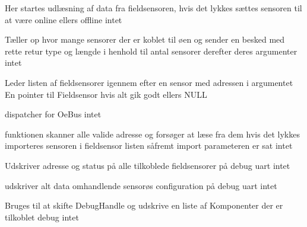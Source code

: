 {Her startes udlæsning af data fra fieldsensoren, hvis det lykkes sættes sensoren til at være online ellers offline}
{intet}
{
}

{Tæller op hvor mange sensorer der er koblet til øen og sender en besked med rette retur type og længde i henhold til antal sensorer derefter deres argumenter}
{intet}
{
}

{Leder listen af fieldsensorer igennem efter en sensor med adressen i argumentet}
{En pointer til Fieldsensor hvis alt gik godt ellers NULL}
{
}

{dispatcher for OeBus}
{intet}
{
}

{funktionen skanner alle valide adresse og forsøger at læse fra dem hvis det lykkes importeres sensoren i fieldsensor listen såfremt import parameteren er sat}
{intet}
{
}

{Udskriver adresse og status på alle tilkoblede fieldsensorer på debug uart}
{intet}
{
}

{udskriver alt data omhandlende sensorøs configuration på debug uart}
{intet}
{
}

{Bruges til at skifte DebugHandle og udskrive en liste af Komponenter der er tilkoblet debug}
{intet}
{
}
